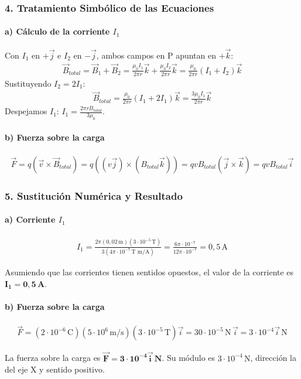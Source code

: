 \subsubsection*{4. Tratamiento Simbólico de las Ecuaciones}
\paragraph*{a) Cálculo de la corriente $I_1$}
Con $I_1$ en $+\vec{j}$ e $I_2$ en $-\vec{j}$, ambos campos en P apuntan en $+\vec{k}$:
\begin{gather}
    \vec{B}_{total} = \vec{B}_1 + \vec{B}_2 = \frac{\mu_0 I_1}{2\pi r} \vec{k} + \frac{\mu_0 I_2}{2\pi r} \vec{k} = \frac{\mu_0}{2\pi r}(I_1+I_2)\vec{k}
\end{gather}
Sustituyendo $I_2 = 2I_1$:
\begin{gather}
    \vec{B}_{total} = \frac{\mu_0}{2\pi r}(I_1+2I_1)\vec{k} = \frac{3\mu_0 I_1}{2\pi r}\vec{k}
\end{gather}
Despejamos $I_1$: $I_1 = \frac{2\pi r B_{total}}{3\mu_0}$.

\paragraph*{b) Fuerza sobre la carga}
\begin{gather}
    \vec{F} = q(\vec{v} \times \vec{B}_{total}) = q((v\vec{j}) \times (B_{total}\vec{k})) = qvB_{total}(\vec{j}\times\vec{k}) = qvB_{total}\vec{i}
\end{gather}

\subsubsection*{5. Sustitución Numérica y Resultado}
\paragraph*{a) Corriente $I_1$}
\begin{gather}
    I_1 = \frac{2\pi (0,02\,\text{m}) (3\cdot10^{-5}\,\text{T})}{3(4\pi\cdot10^{-7}\,\text{T m/A})} = \frac{6\pi\cdot10^{-7}}{12\pi\cdot10^{-7}} = 0,5\,\text{A}
\end{gather}
\begin{cajaresultado}
Asumiendo que las corrientes tienen sentidos opuestos, el valor de la corriente es $\boldsymbol{I_1 = 0,5\,\textbf{A}}$.
\end{cajaresultado}

\paragraph*{b) Fuerza sobre la carga}
\begin{gather}
    \vec{F} = (2\cdot10^{-6}\,\text{C})(5\cdot10^{6}\,\text{m/s})(3\cdot10^{-5}\,\text{T})\vec{i} = 30\cdot10^{-5}\,\text{N}\,\vec{i} = 3\cdot10^{-4}\vec{i}\,\text{N}
\end{gather}
\begin{cajaresultado}
La fuerza sobre la carga es $\boldsymbol{\vec{F} = 3\cdot10^{-4}\vec{i}\,\textbf{N}}$. Su módulo es $3\cdot10^{-4}\,\text{N}$, dirección la del eje X y sentido positivo.
\end{cajaresultado}


